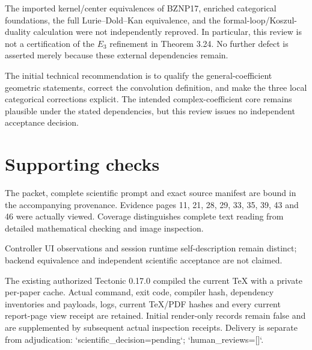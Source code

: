 \documentclass[10pt]{article}
\begin{document}
The imported kernel/center equivalences of BZNP17, enriched categorical foundations, the full Lurie–Dold–Kan equivalence, and the formal-loop/Koszul-duality calculation were not independently reproved. In particular, this review is not a certification of the \(E_3\) refinement in Theorem 3.24. No further defect is asserted merely because these external dependencies remain.\par
The initial technical recommendation is to qualify the general-coefficient geometric statements, correct the convolution definition, and make the three local categorical corrections explicit. The intended complex-coefficient core remains plausible under the stated dependencies, but this review issues no independent acceptance decision.\par
\section*{Supporting checks}
The packet, complete scientific prompt and exact source manifest are bound in the accompanying provenance. Evidence pages 11, 21, 28, 29, 33, 35, 39, 43 and 46 were actually viewed. Coverage distinguishes complete text reading from detailed mathematical checking and image inspection.\par
Controller UI observations and session runtime self-description remain distinct; backend equivalence and independent scientific acceptance are not claimed.\par
The existing authorized Tectonic 0.17.0 compiled the current TeX with a private per-paper cache. Actual command, exit code, compiler hash, dependency inventories and payloads, logs, current TeX/PDF hashes and every current report-page view receipt are retained. Initial render-only records remain false and are supplemented by subsequent actual inspection receipts. Delivery is separate from adjudication: `scientific\_decision=pending`; `human\_reviews=[]`.\par
\end{document}
